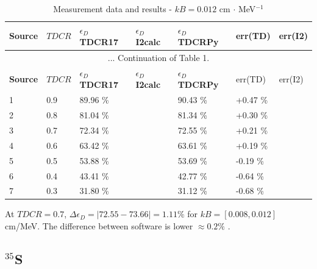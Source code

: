 \documentclass[12pt]{iopart}
\begin{document}
\begingroup
\footnotesize
\begin{longtable}[l]{| p{} | p{} |p{} |p{} |p{} |p{} |p{} |} 
\caption{Measurement data and results - $kB = 0.012$ cm $\cdot$ MeV$^{-1}$}
\label{Table1} \\ 
\hline
\textbf{Source} & \textbf{$TDCR$} & \textbf{$\epsilon_{D}$ TDCR17} & \textbf{$\epsilon_{D}$ I2calc} & \textbf{$\epsilon_{D}$ TDCRPy} & err(TD)& err(I2) \\ 
\endfirsthead
\multicolumn{7}{c}{... Continuation of Table 1.}\\ 
\hline
 \textbf{Source} & \textbf{$TDCR$} & \textbf{$\epsilon_{D}$ TDCR17} & \textbf{$\epsilon_{D}$ I2calc} & \textbf{$\epsilon_{D}$ TDCRPy} & err(TD)& err(I2) \\   \hline 
\endhead
\hline
 1 & 0.9   &   89.96 \% &  & 90.43 \% & +0.47 \% & \\
 2 & 0.8   &   81.04 \% &  & 81.34 \% & +0.30 \% & \\
 3 & 0.7   &   72.34 \% &  & 72.55 \% & +0.21 \% & \\
 4 & 0.6   &   63.42 \% &  & 63.61 \% & +0.19 \% & \\
 5 & 0.5   &   53.88 \% &  & 53.69 \% & -0.19 \% & \\
 6 & 0.4   &   43.41 \% &  & 42.77 \% & -0.64 \% & \\
 7 & 0.3   &   31.80 \% &  & 31.12 \% & -0.68 \% & \\
\hline
\end{longtable} 
\endgroup

At $TDCR = 0.7$, $\Delta \epsilon_D = |72.55 - 73.66| = 1.11 \%$ for $kB = [0.008, 0.012]$ cm/MeV. The difference between software is lower $\approx 0.2 \%$ . 

\pagebreak
\subsection{$^{35}$S}
\end{document}
